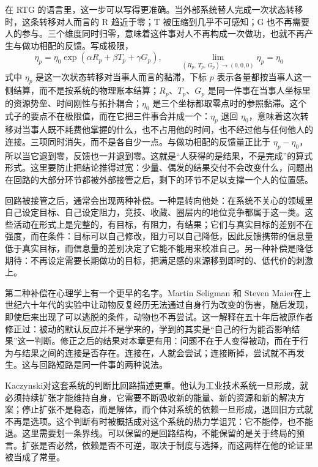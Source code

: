 在 RTG 的语言里，这一步可以写得更准确。当外部系统替人完成一次状态转移时，这条转移对人而言的 R 趋近于零；T 被压缩到几乎不可感知；G 也不再需要人的参与。三个维度同时归零，意味着这件事对人不再构成一次做功，也就不再产生与做功相配的反馈。写成极限，
\begin{equation}
\eta_{p}=\eta_{0}\exp(\alpha R_{p}+\beta T_{p}+\gamma G_{p}),
\qquad
\lim_{(R_{p},\,T_{p},\,G_{p})\to(0,0,0)}\eta_{p}=\eta_{0}
\label{eq:trip-zero}
\end{equation}
式中 $\eta_{p}$ 是这一次状态转移对当事人而言的黏滞，下标 $p$ 表示各量都按当事人这一侧结算，而不是按系统的物理账本结算；$R_{p}$、$T_{p}$、$G_{p}$ 是同一件事在当事人坐标里的资源势垒、时间刚性与拓扑耦合；$\eta_{0}$ 是三个坐标都取零点时的参照黏滞。这个式子的要点不在极限值，而在它把三件事合并成一个：$\eta_{p}$ 退回 $\eta_{0}$，意味着这次转移对当事人既不耗费他掌握的什么，也不占用他的时间，也不经过他与任何他人的连接。三项同时消失，而不是各自少一点。与做功相配的反馈量正比于 $\eta_{p}-\eta_{0}$，所以当它退到零，反馈也一并退到零。这就是“人获得的是结果，不是完成”的算式形式。这里要防止把结论推得过宽：少量、偶发的结果交付不会改变什么，问题出在回路的大部分环节都被外部接管之后，剩下的环节不足以支撑一个人的位置感。

回路被接管之后，通常会出现两种补偿。一种是转向他处：在系统不关心的领域里自己设定目标、自己设定阻力，竞技、收藏、圈层内的地位竞争都属于这一类。这些活动在形式上是完整的，有目标，有阻力，有结果；它们与真实目标的差别不在强度，而在条件：目标可以自己修改，阻力可以自己降低，因此反馈携带的信息量低于真实目标，而信息量的差别决定了它能不能用来校准自己。另一种补偿是降低期待：不再设定需要长期做功的目标，把满足感的来源移到即时的、低代价的刺激上。

第二种补偿在心理学上有一个更早的名字。Martin Seligman 和 Steven Maier在上世纪六十年代的实验中让动物反复经历无法通过自身行为改变的伤害，随后发现，即使后来出现了可以逃脱的条件，动物也不再尝试\cite{seligman1967failure}。这一解释在五十年后被原作者修正过：被动的默认反应并不是学来的，学到的其实是“自己的行为能否影响结果”这一判断\cite{maier2016learned}。修正之后的结果对本章更有用：问题不在于人变得被动，而在于行为与结果之间的连接是否存在。连接在，人就会尝试；连接断掉，尝试就不再发生。这与回路短路是同一件事的两种说法。

Kaczynski对这套系统的判断比回路描述更重。他认为工业技术系统一旦形成，就必须持续扩张才能维持自身，它需要不断吸收新的能量、新的资源和新的解决方案；停止扩张不是稳态，而是解体，而个体对系统的依赖一旦形成，退回旧方式就不再是选项。这个判断有时被概括成对这个系统的热力学诅咒：它不能停，也不能退。这里需要划一条界线。可以保留的是回路结构，不能保留的是关于终局的预言。扩张是否必然，依赖是否不可逆，取决于制度与选择，而这两样在他的论证里被当成了常量。

